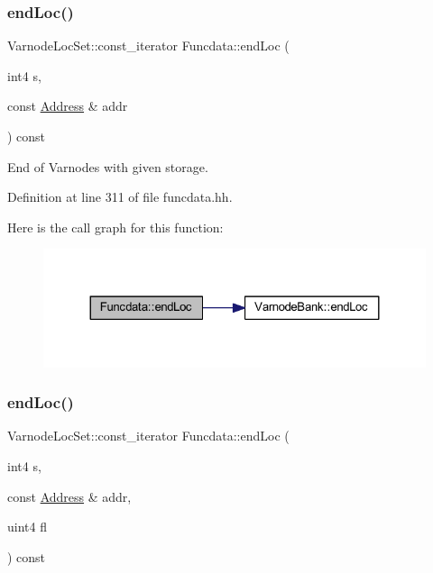 \subsubsection{\texorpdfstring{endLoc()}{endLoc()}\hspace{0.1cm}{\footnotesize\ttfamily [4/6]}}
{\footnotesize\ttfamily Varnode\+Loc\+Set\+::const\+\_\+iterator Funcdata\+::end\+Loc (\begin{DoxyParamCaption}\item[{int4}]{s,  }\item[{const \mbox{\hyperlink{class_address}{Address}} \&}]{addr }\end{DoxyParamCaption}) const\hspace{0.3cm}{\ttfamily [inline]}}



End of Varnodes with given storage. 



Definition at line 311 of file funcdata.\+hh.

Here is the call graph for this function\+:
\nopagebreak
\begin{figure}[H]
\begin{center}
\leavevmode
\includegraphics[width=324pt]{class_funcdata_ac026cfb35c8a407c50d21837510d78f7_cgraph}
\end{center}
\end{figure}
\mbox{\label{class_funcdata_a9b418941dce53af9e8ac8dcbd453a44f}} 
\subsubsection{\texorpdfstring{endLoc()}{endLoc()}\hspace{0.1cm}{\footnotesize\ttfamily [5/6]}}
{\footnotesize\ttfamily Varnode\+Loc\+Set\+::const\+\_\+iterator Funcdata\+::end\+Loc (\begin{DoxyParamCaption}\item[{int4}]{s,  }\item[{const \mbox{\hyperlink{class_address}{Address}} \&}]{addr,  }\item[{uint4}]{fl }\end{DoxyParamCaption}) const\hspace{0.3cm}{\ttfamily [inline]}}



